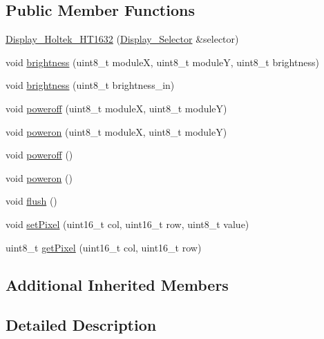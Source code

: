 \subsection*{Public Member Functions}
\begin{DoxyCompactItemize}
\item 
\hyperlink{classflame_1_1_display___holtek___h_t1632_a90942b33ed365103587c3b41c86056a6}{Display\-\_\-\-Holtek\-\_\-\-H\-T1632} (\hyperlink{classflame_1_1_display___selector}{Display\-\_\-\-Selector} \&selector)
\item 
void \hyperlink{classflame_1_1_display___holtek___h_t1632_a501199880d545f00614a944b96bf15d3}{brightness} (uint8\-\_\-t module\-X, uint8\-\_\-t module\-Y, uint8\-\_\-t brightness)
\item 
void \hyperlink{classflame_1_1_display___holtek___h_t1632_ab0efbd2a37bdfdf74a08ff8458d48909}{brightness} (uint8\-\_\-t brightness\-\_\-in)
\item 
void \hyperlink{classflame_1_1_display___holtek___h_t1632_a09eabd78de86f9ae3b1f260643fd5d8f}{poweroff} (uint8\-\_\-t module\-X, uint8\-\_\-t module\-Y)
\item 
void \hyperlink{classflame_1_1_display___holtek___h_t1632_a2f6c37d8789536447710648ce5b7a54c}{poweron} (uint8\-\_\-t module\-X, uint8\-\_\-t module\-Y)
\item 
void \hyperlink{classflame_1_1_display___holtek___h_t1632_aa64a5e76e4885013e5e25e96053dab51}{poweroff} ()
\item 
void \hyperlink{classflame_1_1_display___holtek___h_t1632_a54d6acaa4fa5072e7b7001cf86a4cf3f}{poweron} ()
\item 
void \hyperlink{classflame_1_1_display___holtek___h_t1632_a1927231d0266e2515ca2d3eb51ff5046}{flush} ()
\item 
void \hyperlink{classflame_1_1_display___holtek___h_t1632_a0fffd0acf421a4b9e00bc5675f526109}{set\-Pixel} (uint16\-\_\-t col, uint16\-\_\-t row, uint8\-\_\-t value)
\item 
uint8\-\_\-t \hyperlink{classflame_1_1_display___holtek___h_t1632_aa3930885169c3684f5aaac806a16d682}{get\-Pixel} (uint16\-\_\-t col, uint16\-\_\-t row)
\end{DoxyCompactItemize}
\subsection*{Additional Inherited Members}


\subsection{Detailed Description}

